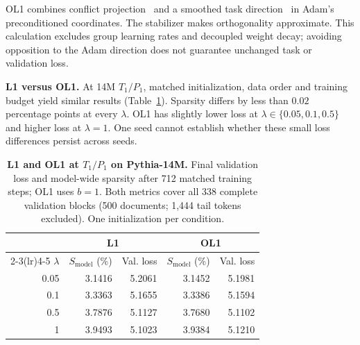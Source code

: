 OL1 combines conflict projection~\citep{yu2020pcgrad} and a smoothed task
direction~\citep{hsieh2024bloop} in Adam's preconditioned coordinates.
The stabilizer makes orthogonality approximate. This calculation excludes
group learning rates and decoupled weight decay; avoiding opposition to the
Adam direction does not guarantee unchanged task or validation loss.

\textbf{L1 versus OL1.}
At 14M $T_1/P_1$, matched initialization, data order and training budget yield
similar results (Table~\ref{tab:l1-ol1}). Sparsity differs by less than
$0.02$ percentage points at every $\lambda$. OL1 has slightly lower loss at
$\lambda\in\{0.05,0.1,0.5\}$ and higher loss at $\lambda=1$.
One seed cannot establish whether these small loss differences persist across seeds.

\begin{table}[!htbp]
\centering
\small
\caption{\textbf{L1 and OL1 at $T_1/P_1$ on Pythia-14M.} Final validation loss and model-wide sparsity after 712 matched training steps; OL1 uses $b=1$. Both metrics cover all 338 complete validation blocks (500 documents; 1,444 tail tokens excluded). One initialization per condition.}
\label{tab:l1-ol1}
\begin{tabular}{r rr rr}
\toprule
 & \multicolumn{2}{c}{L1} & \multicolumn{2}{c}{OL1} \\
\cmidrule(lr){2-3}\cmidrule(lr){4-5}
$\lambda$ & $S_{\mathrm{model}}$ (\%) & Val. loss & $S_{\mathrm{model}}$ (\%) & Val. loss \\
\midrule
0.05 & 3.1416 & 5.2061 & 3.1452 & 5.1981 \\
0.1 & 3.3363 & 5.1655 & 3.3386 & 5.1594 \\
0.5 & 3.7876 & 5.1127 & 3.7680 & 5.1102 \\
1 & 3.9493 & 5.1023 & 3.9384 & 5.1210 \\
\bottomrule
\end{tabular}
\end{table}
